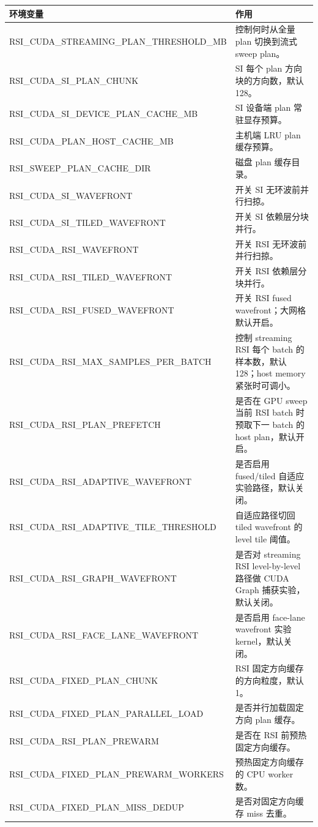 \documentclass[10pt]{article}
\begin{document}
\begin{tabularx}{\linewidth}{>{\ttfamily}l X}
\toprule
环境变量 & 作用\\
\midrule
RSI\_CUDA\_STREAMING\_PLAN\_THRESHOLD\_MB & 控制何时从全量 plan 切换到流式 sweep plan。\\
RSI\_CUDA\_SI\_PLAN\_CHUNK & SI 每个 plan 方向块的方向数，默认 128。\\
RSI\_CUDA\_SI\_DEVICE\_PLAN\_CACHE\_MB & SI 设备端 plan 常驻显存预算。\\
RSI\_CUDA\_PLAN\_HOST\_CACHE\_MB & 主机端 LRU plan 缓存预算。\\
RSI\_SWEEP\_PLAN\_CACHE\_DIR & 磁盘 plan 缓存目录。\\
RSI\_CUDA\_SI\_WAVEFRONT & 开关 SI 无环波前并行扫掠。\\
RSI\_CUDA\_SI\_TILED\_WAVEFRONT & 开关 SI 依赖层分块并行。\\
RSI\_CUDA\_RSI\_WAVEFRONT & 开关 RSI 无环波前并行扫掠。\\
RSI\_CUDA\_RSI\_TILED\_WAVEFRONT & 开关 RSI 依赖层分块并行。\\
RSI\_CUDA\_RSI\_FUSED\_WAVEFRONT & 开关 RSI fused wavefront；大网格默认开启。\\
RSI\_CUDA\_RSI\_MAX\_SAMPLES\_PER\_BATCH & 控制 streaming RSI 每个 batch 的样本数，默认 128；host memory 紧张时可调小。\\
RSI\_CUDA\_RSI\_PLAN\_PREFETCH & 是否在 GPU sweep 当前 RSI batch 时预取下一 batch 的 host plan，默认开启。\\
RSI\_CUDA\_RSI\_ADAPTIVE\_WAVEFRONT & 是否启用 fused/tiled 自适应实验路径，默认关闭。\\
RSI\_CUDA\_RSI\_ADAPTIVE\_TILE\_THRESHOLD & 自适应路径切回 tiled wavefront 的 level tile 阈值。\\
RSI\_CUDA\_RSI\_GRAPH\_WAVEFRONT & 是否对 streaming RSI level-by-level 路径做 CUDA Graph 捕获实验，默认关闭。\\
RSI\_CUDA\_RSI\_FACE\_LANE\_WAVEFRONT & 是否启用 face-lane wavefront 实验 kernel，默认关闭。\\
RSI\_CUDA\_FIXED\_PLAN\_CHUNK & RSI 固定方向缓存的方向粒度，默认 1。\\
RSI\_CUDA\_FIXED\_PLAN\_PARALLEL\_LOAD & 是否并行加载固定方向 plan 缓存。\\
RSI\_CUDA\_RSI\_PLAN\_PREWARM & 是否在 RSI 前预热固定方向缓存。\\
RSI\_CUDA\_FIXED\_PLAN\_PREWARM\_WORKERS & 预热固定方向缓存的 CPU worker 数。\\
RSI\_CUDA\_FIXED\_PLAN\_MISS\_DEDUP & 是否对固定方向缓存 miss 去重。\\
\bottomrule
\end{tabularx}
\end{document}

